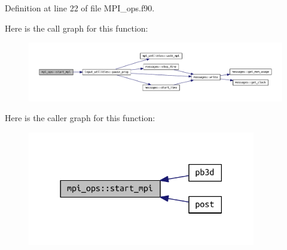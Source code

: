 Definition at line 22 of file M\+P\+I\+\_\+ops.\+f90.

Here is the call graph for this function\+:\nopagebreak
\begin{figure}[H]
\begin{center}
\leavevmode
\includegraphics[width=350pt]{namespacempi__ops_a804ec65ff711509de1f8873f97bdf967_cgraph}
\end{center}
\end{figure}
Here is the caller graph for this function\+:\nopagebreak
\begin{figure}[H]
\begin{center}
\leavevmode
\includegraphics[width=282pt]{namespacempi__ops_a804ec65ff711509de1f8873f97bdf967_icgraph}
\end{center}
\end{figure}
\mbox{\label{namespacempi__ops_a9dcb5624e665c9e15a4203edb5f44b0f}} 

